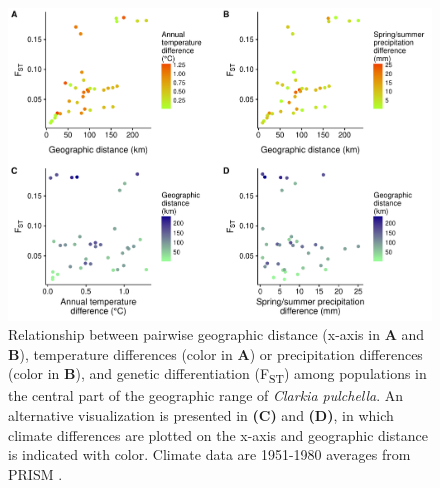 \documentclass{article}
\begin{document}
\begin{figure}[p]
\centering
\includegraphics[width=16cm]{figs/fst_clim_dist_center.pdf}
\caption[Pairwise differences and genetic differentiation among central populations]{Relationship between pairwise geographic distance (x-axis in \textbf{A} and \textbf{B}), temperature differences (color in \textbf{A}) or precipitation differences (color in \textbf{B}), and genetic differentiation (F\textsubscript{ST}) among populations in the central part of the geographic range of \textit{Clarkia pulchella}. An alternative visualization is presented in \textbf{(C)} and \textbf{(D)}, in which climate differences are plotted on the x-axis and geographic distance is indicated with color.  Climate data are 1951-1980 averages from PRISM \citep{PRISM}.}
\label{fst_center}
\end{figure}

\clearpage
\end{document}
